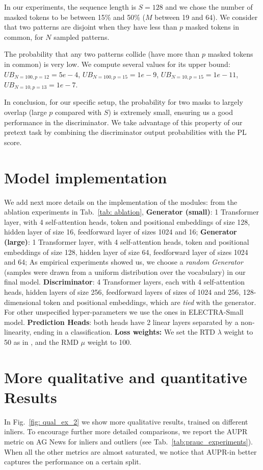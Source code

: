 \documentclass[11pt]{article}
\begin{document}
In our experiments, the sequence length is $S = 128$ and we chose the number of masked tokens to be between 15\% and 50\% ($M$ between 19 and 64). We consider that two patterns are disjoint when they have less than $p$ masked tokens in common, for $N$ sampled patterns.


The probability that any two patterns collide (have more than $p$ masked tokens in common) is very low. We compute several values for its upper bound: $UB_{N=100, p=12}=5e-4$, $UB_{N=100, p=15}=1e-9$, $UB_{N=10, p=15}=1e-11$, $UB_{N=10, p=13}=1e-7$.

In conclusion, for our specific setup, the probability for two masks to largely overlap (large $p$ compared with $S$) is extremely small, ensuring us a good performance in the discriminator. We take advantage of this property of our pretext task by combining the discriminator output probabilities with the PL score.

\section{Model implementation}
\label{apx:model_implementation_details}
We add next more details on the implementation of the modules: from the ablation experiments in Tab.~\ref{tab: ablation}, \textbf{Generator (small)}: 1 Transformer layer, with 4 self-attention heads, token and positional embeddings of size 128, hidden layer of size 16, feedforward layer of sizes 1024 and 16; \textbf{Generator (large)}: 1 Transformer layer, with 4 self-attention heads, token and positional embeddings of size 128, hidden layer of size 64, feedforward layer of sizes 1024 and 64;
As empirical experiments showed us, we choose a \emph{random Generator} (samples were drawn from a uniform distribution over the vocabulary) in our final model.
\textbf{Discriminator}: 4 Transformer layers, each with 4 self-attention heads, hidden layers of size 256, feedforward layers of sizes of 1024 and 256, 128-dimensional token and positional embeddings, which are \emph{tied} with the generator. For other unspecified hyper-parameters we use the ones in ELECTRA-Small model.
\textbf{Prediction Heads}: both heads have 2 linear layers separated by a non-linearity, ending in a classification. \textbf{Loss weights:} We set the RTD $\lambda$ weight to 50 as in \cite{Clark2020}, and the RMD $\mu$ weight to 100.


\section{More qualitative and quantitative Results}
\label{apx:prauc_experiments}
In Fig.~\ref{fig: qual_ex_2} we show more qualitative results, trained on different inliers. To encourage further more detailed comparisons, we report the AUPR metric on AG News for inliers and outliers (see Tab.~\ref{tab:prauc_experiments}). When all the other metrics are almost saturated, we notice that AUPR-in better captures the performance on a certain split.
\end{document}
